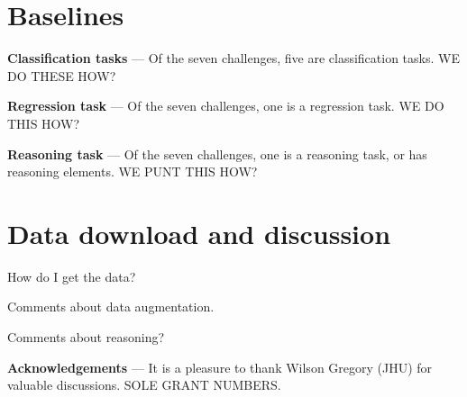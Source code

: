 \documentclass{article}
\renewcommand{\paragraph}[1]{\par\medskip\noindent\textbf{#1} ---}
\begin{document}
\section{Baselines}

\paragraph{Classification tasks}
Of the seven challenges, five are classification tasks.
WE DO THESE HOW?

\paragraph{Regression task}
Of the seven challenges, one is a regression task.
WE DO THIS HOW?

\paragraph{Reasoning task}
Of the seven challenges, one is a reasoning task, or has reasoning elements.
WE PUNT THIS HOW?

\section{Data download and discussion}

How do I get the data?

Comments about data augmentation.

Comments about reasoning?

\paragraph{Acknowledgements}
It is a pleasure to thank
  Wilson Gregory (JHU)
for valuable discussions.
SOLE GRANT NUMBERS.


\raggedright

\end{document}
